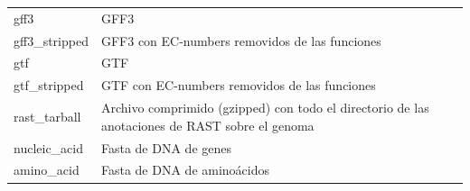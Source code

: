 \documentclass[12pt,twoside]{reedthesis}
\begin{document}
\begin{longtable}[]{@{}ll@{}}
\begin{minipage}[t]{0.22\columnwidth}
  gff3\strut
  \end{minipage} & \begin{minipage}[t]{0.72\columnwidth}\raggedright\strut
  GFF3\strut
  \end{minipage}\tabularnewline
  \begin{minipage}[t]{0.22\columnwidth}\raggedright\strut
  gff3\_stripped\strut
  \end{minipage} & \begin{minipage}[t]{0.72\columnwidth}\raggedright\strut
  GFF3 con EC-numbers removidos de las funciones\strut
  \end{minipage}\tabularnewline
  \begin{minipage}[t]{0.22\columnwidth}\raggedright\strut
  gtf\strut
  \end{minipage} & \begin{minipage}[t]{0.72\columnwidth}\raggedright\strut
  GTF\strut
  \end{minipage}\tabularnewline
  \begin{minipage}[t]{0.22\columnwidth}\raggedright\strut
  gtf\_stripped\strut
  \end{minipage} & \begin{minipage}[t]{0.72\columnwidth}\raggedright\strut
  GTF con EC-numbers removidos de las funciones\strut
  \end{minipage}\tabularnewline
  \begin{minipage}[t]{0.22\columnwidth}\raggedright\strut
  rast\_tarball\strut
  \end{minipage} & \begin{minipage}[t]{0.72\columnwidth}\raggedright\strut
  Archivo comprimido (gzipped) con todo el directorio de las anotaciones
  de RAST sobre el genoma\strut
  \end{minipage}\tabularnewline
  \begin{minipage}[t]{0.22\columnwidth}\raggedright\strut
  nucleic\_acid\strut
  \end{minipage} & \begin{minipage}[t]{0.72\columnwidth}\raggedright\strut
  Fasta de DNA de genes\strut
  \end{minipage}\tabularnewline
  \begin{minipage}[t]{0.22\columnwidth}\raggedright\strut
  amino\_acid\strut
  \end{minipage} & \begin{minipage}[t]{0.72\columnwidth}\raggedright\strut
  Fasta de DNA de aminoácidos\strut
  \end{minipage}\tabularnewline

\end{longtable}
\end{document}
